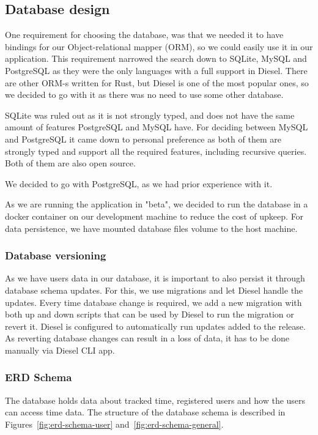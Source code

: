 \subsection{Database design}\label{subsec:database-design}
One requirement for choosing the database, was that we needed it to have bindings for our Object-relational mapper (ORM),
so we could easily use it in our application.
This requirement narrowed the search down to SQLite, MySQL and PostgreSQL as they were the only languages with a full support in Diesel.
There are other ORM-s written for Rust, but Diesel is one of the most popular ones, so we decided to go with it as
there was no need to use some other database.

SQLite was ruled out as it is not strongly typed, and does not have the same amount of features PostgreSQL and MySQL have.
For deciding between MySQL and PostgreSQL it came down to personal preference as both of them are strongly typed and
support all the required features, including recursive queries.
Both of them are also open source.

We decided to go with PostgreSQL, as we had prior experience with it.

As we are running the application in "beta", we decided to run the database in a docker container on our development machine to
reduce the cost of upkeep.
For data persistence, we have mounted database files volume to the host machine.

\subsubsection{Database versioning}\label{subsubsec:database-versioning}
As we have users data in our database, it is important to also persist it through database schema updates.
For this, we use migrations and let Diesel handle the updates.
Every time database change is required, we add a new migration with both up and down scripts that can be used by Diesel
to run the migration or revert it.
Diesel is configured to automatically run updates added to the release.
As reverting database changes can result in a loss of data, it has to be done manually via Diesel CLI app.

\subsubsection{ERD Schema}\label{subsubsec:erd-schema}
The database holds data about tracked time, registered users and how the users can access time data.
The structure of the database schema is described in Figures~\ref{fig:erd-schema-user} and~\ref{fig:erd-schema-general}.

